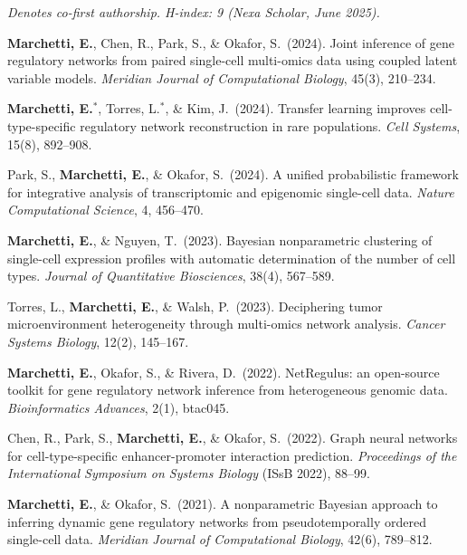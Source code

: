 \documentclass[11pt,a4paper]{article}
\begin{document}
{\small
\textit{Denotes co-first authorship. H-index: 9 (Nexa Scholar, June 2025).}

\begin{enumerate}[leftmargin=2.5em,label={[\arabic*]},itemsep=5pt,topsep=6pt]
  \item \textbf{Marchetti, E.}, Chen, R., Park, S., \& Okafor, S.\ (2024). Joint inference of gene regulatory networks from paired single-cell multi-omics data using coupled latent variable models. \textit{Meridian Journal of Computational Biology}, 45(3), 210--234.

  \item \textbf{Marchetti, E.}$^\ast$, Torres, L.$^\ast$, \& Kim, J.\ (2024). Transfer learning improves cell-type-specific regulatory network reconstruction in rare populations. \textit{Cell Systems}, 15(8), 892--908.

  \item Park, S., \textbf{Marchetti, E.}, \& Okafor, S.\ (2024). A unified probabilistic framework for integrative analysis of transcriptomic and epigenomic single-cell data. \textit{Nature Computational Science}, 4, 456--470.

  \item \textbf{Marchetti, E.}, \& Nguyen, T.\ (2023). Bayesian nonparametric clustering of single-cell expression profiles with automatic determination of the number of cell types. \textit{Journal of Quantitative Biosciences}, 38(4), 567--589.

  \item Torres, L., \textbf{Marchetti, E.}, \& Walsh, P.\ (2023). Deciphering tumor microenvironment heterogeneity through multi-omics network analysis. \textit{Cancer Systems Biology}, 12(2), 145--167.

  \item \textbf{Marchetti, E.}, Okafor, S., \& Rivera, D.\ (2022). NetRegulus: an open-source toolkit for gene regulatory network inference from heterogeneous genomic data. \textit{Bioinformatics Advances}, 2(1), btac045.

  \item Chen, R., Park, S., \textbf{Marchetti, E.}, \& Okafor, S.\ (2022). Graph neural networks for cell-type-specific enhancer-promoter interaction prediction. \textit{Proceedings of the International Symposium on Systems Biology} (IS\lowercase{s}B 2022), 88--99.

  \item \textbf{Marchetti, E.}, \& Okafor, S.\ (2021). A nonparametric Bayesian approach to inferring dynamic gene regulatory networks from pseudotemporally ordered single-cell data. \textit{Meridian Journal of Computational Biology}, 42(6), 789--812.


\end{enumerate}}
\end{document}
